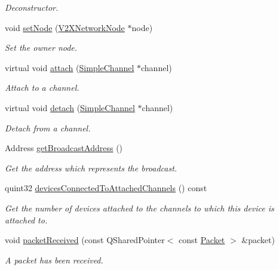 \begin{DoxyCompactItemize}
\begin{DoxyCompactList}\small\item\em Deconstructor. \end{DoxyCompactList}\item 
void \hyperlink{classSimpleNetDevice_a8ff228ecc433a6ed058bdcb290f08458}{set\+Node} (\hyperlink{classV2XNetworkNode}{V2\+X\+Network\+Node} $\ast$node)
\begin{DoxyCompactList}\small\item\em Set the owner node. \end{DoxyCompactList}\item 
virtual void \hyperlink{classSimpleNetDevice_a525799a679531561aa37c1621a744373}{attach} (\hyperlink{classSimpleChannel}{Simple\+Channel} $\ast$channel)
\begin{DoxyCompactList}\small\item\em Attach to a channel. \end{DoxyCompactList}\item 
virtual void \hyperlink{classSimpleNetDevice_a9abf0fa7a4808ce9343a964f141da25c}{detach} (\hyperlink{classSimpleChannel}{Simple\+Channel} $\ast$channel)
\begin{DoxyCompactList}\small\item\em Detach from a channel. \end{DoxyCompactList}\item 
Address \hyperlink{classSimpleNetDevice_af57b3191ab96448629dddbeadbb91960}{get\+Broadcast\+Address} ()
\begin{DoxyCompactList}\small\item\em Get the address which represents the broadcast. \end{DoxyCompactList}\item 
quint32 \hyperlink{classSimpleNetDevice_aa169aa32a738e2980b08ddc32cb6a252}{devices\+Connected\+To\+Attached\+Channels} () const 
\begin{DoxyCompactList}\small\item\em Get the number of devices attached to the channels to which this device is attached to. \end{DoxyCompactList}\item 
void \hyperlink{classSimpleNetDevice_a24c1075eb17c31001763e3b77692550e}{packet\+Received} (const Q\+Shared\+Pointer$<$ const \hyperlink{group__V2XFramework_ga1b82bfc289dbcb9aced56200d7abc964}{Packet} $>$ \&packet)
\begin{DoxyCompactList}\small\item\em A packet has been received. \end{DoxyCompactList}\item 

\end{DoxyCompactItemize}
